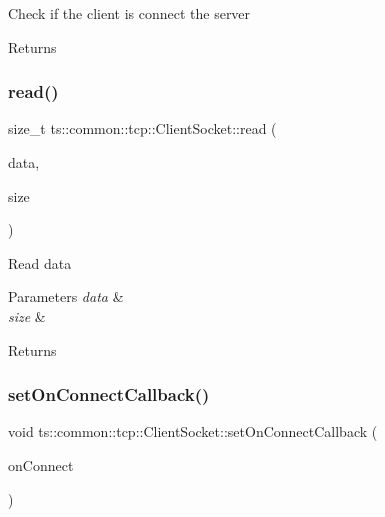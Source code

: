 Check if the client is connect the server \begin{DoxyReturn}{Returns}

\end{DoxyReturn}
\mbox{\label{classts_1_1common_1_1tcp_1_1_client_socket_a7876d2f81c6bf60f628973577dfabd2a}} 
\subsubsection{\texorpdfstring{read()}{read()}}
{\footnotesize\ttfamily size\+\_\+t ts\+::common\+::tcp\+::\+Client\+Socket\+::read (\begin{DoxyParamCaption}\item[{void $\ast$}]{data,  }\item[{size\+\_\+t}]{size }\end{DoxyParamCaption})}

Read data 
\begin{DoxyParams}{Parameters}
{\em data} & \\
\hline
{\em size} & \\
\hline
\end{DoxyParams}
\begin{DoxyReturn}{Returns}

\end{DoxyReturn}
\mbox{\label{classts_1_1common_1_1tcp_1_1_client_socket_aeb8c00f0828b0d61c0f2a4b1aa486ff4}} 
\subsubsection{\texorpdfstring{set\+On\+Connect\+Callback()}{setOnConnectCallback()}}
{\footnotesize\ttfamily void ts\+::common\+::tcp\+::\+Client\+Socket\+::set\+On\+Connect\+Callback (\begin{DoxyParamCaption}\item[{On\+Connect\+Func}]{on\+Connect }\end{DoxyParamCaption})}

